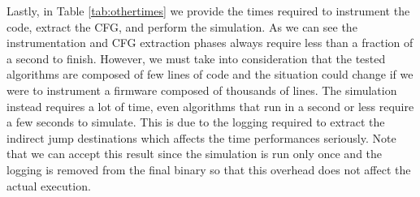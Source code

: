 Lastly, in Table \ref{tab:othertimes} we provide the times required to instrument
the code, extract the CFG, and perform the simulation. As we can see the
instrumentation and CFG extraction phases always require less than a fraction of
a second to finish. However, we must take into consideration that the tested
algorithms are composed of few lines of code and the situation could change if
we were to instrument a firmware composed of thousands of lines. The simulation instead
requires a lot of time, even algorithms that run in a second or less require a
few seconds to simulate. This is due to the logging required to extract the indirect
jump destinations which affects the time performances seriously. Note that we
can accept this result since the simulation is run only once and the logging is
removed from the final binary so that this overhead does not affect the actual
execution.

